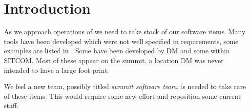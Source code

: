 \section{Introduction} \label{sec:intro}
As we approach operations of \VRO we need to take stock of our \gls{software} items.
Many tools have been developed which were not well specified in requirements, some examples are listed in .
Some have been developed by \gls{DM} and some within \gls{SITCOM}.
Most of these appear on the summit, a location \gls{DM} was never intended to have a large foot print.


We feel a new team, possibly titled \emph{summit software team}, is needed to take care of these items.
This would require some new effort and reposition some current staff.

